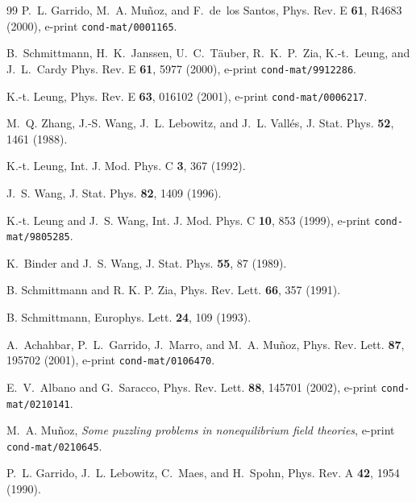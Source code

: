 \documentclass[12pt]{article}
\begin{document}
\begin{thebibliography}{99}
P.~L. Garrido, M.~A. Mu{\~n}oz, and F.~de~los Santos,
Phys. Rev. E {\bf 61}, R4683 (2000),
e-print {\tt cond-mat/0001165}.

B.~Schmittmann, H.~K.~Janssen, U.~C.~T{\"a}uber,
R.~K.~P.~Zia, {K.-t.}~Leung, and J.~L.~Cardy 
\newblock Phys. Rev. E {\bf 61}, 5977 (2000),
e-print {\tt cond-mat/9912286}.

K.-t. Leung,
\newblock Phys. Rev. E {\bf 63}, 016102 (2001),
e-print {\tt cond-mat/0006217}.

M.~Q. Zhang, J.-S. Wang, J.~L. Lebowitz, and J.~L. Vall\'es,
\newblock J. Stat. Phys. {\bf 52}, 1461 (1988).

K.-t. Leung,
\newblock Int. J. Mod. Phys. C {\bf 3}, 367 (1992).

J.~S. Wang,
\newblock J. Stat. Phys. {\bf 82}, 1409 (1996).

K.-t. Leung and J.~S. Wang,
Int. J. Mod. Phys. C {\bf 10}, 853 (1999),
e-print {\tt cond-mat/9805285}.

K.~Binder and J.~S. Wang,
\newblock J. Stat. Phys. {\bf 55}, 87 (1989).

B. Schmittmann and R. K. P. Zia,
Phys. Rev. Lett. {\bf 66}, 357 (1991). 

B. Schmittmann, Europhys. Lett. {\bf 24}, 109 (1993).

A.~Achahbar, P.~L.~Garrido, J.~Marro, and M.~A. Mu{\~n}oz,
Phys. Rev. Lett. {\bf 87}, 195702 (2001),
e-print {\tt cond-mat/0106470}.

E.~V.~Albano and G.~Saracco,  Phys. Rev. Lett. {\bf 88}, 145701 (2002),
e-print {\tt cond-mat/0210141}.

M.~A. Mu{\~n}oz, {\em Some puzzling problems in nonequilibrium field
theories}, e-print {\tt cond-mat/0210645}.

P.~L. Garrido, J.~L. Lebowitz, C.~Maes, and H.~Spohn,
\newblock Phys. Rev. A {\bf 42}, 1954 (1990).


\end{thebibliography}
\end{document}
